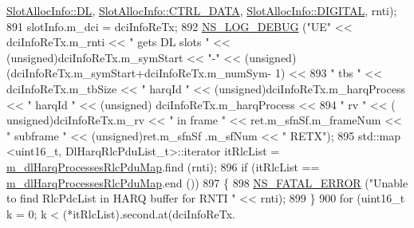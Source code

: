 \begin{DoxyCode}
      \hyperlink{structns3_1_1SlotAllocInfo_a6cad60db1d39034f1851e2cea625fe5da9a365c9c56b7c32dcae38ee1a468ce6d}{SlotAllocInfo::DL}, \hyperlink{structns3_1_1SlotAllocInfo_a3ea7cb503bfd0c9a4df55a71b81b9331a1ea636c3f068558fabacbc39934309b8}{SlotAllocInfo::CTRL\_DATA}, 
      \hyperlink{structns3_1_1SlotAllocInfo_adcbd067d82be6260b3399167d8f0b4eca47a67c342db658a08ded9ce4b49417ea}{SlotAllocInfo::DIGITAL}, rnti);
891                                         slotInfo.m\_dci = dciInfoReTx;
892                                         \hyperlink{group__logging_ga413f1886406d49f59a6a0a89b77b4d0a}{NS\_LOG\_DEBUG} (\textcolor{stringliteral}{"UE"} << dciInfoReTx.m\_rnti << \textcolor{stringliteral}{" gets DL
       slots "} << (\textcolor{keywordtype}{unsigned})dciInfoReTx.m\_symStart << \textcolor{stringliteral}{"-"} << (\textcolor{keywordtype}{unsigned})(dciInfoReTx.m\_symStart+dciInfoReTx.m\_numSym-
      1) <<
893                                                                                                 \textcolor{stringliteral}{" tbs "} << 
      dciInfoReTx.m\_tbSize << \textcolor{stringliteral}{" harqId "} << (\textcolor{keywordtype}{unsigned})dciInfoReTx.m\_harqProcess << \textcolor{stringliteral}{" harqId "} << (\textcolor{keywordtype}{unsigned})
      dciInfoReTx.m\_harqProcess <<
894                                                                                                 \textcolor{stringliteral}{" rv "} << (\textcolor{keywordtype}{
      unsigned})dciInfoReTx.m\_rv << \textcolor{stringliteral}{" in frame "} << ret.m\_sfnSf.m\_frameNum << \textcolor{stringliteral}{" subframe "} << (\textcolor{keywordtype}{unsigned})ret.m\_sfnSf
      .m\_sfNum << \textcolor{stringliteral}{" RETX"});
895                                         std::map <uint16\_t, DlHarqRlcPduList\_t>::iterator itRlcList =  
      \hyperlink{classns3_1_1MmWaveFlexTtiPfMacScheduler_a9a0027a79dee0a60f04e55c25efb7ab7}{m\_dlHarqProcessesRlcPduMap}.find (rnti);
896                                         \textcolor{keywordflow}{if} (itRlcList == 
      \hyperlink{classns3_1_1MmWaveFlexTtiPfMacScheduler_a9a0027a79dee0a60f04e55c25efb7ab7}{m\_dlHarqProcessesRlcPduMap}.end ())
897                                         \{
898                                                 \hyperlink{group__fatal_ga5131d5e3f75d7d4cbfd706ac456fdc85}{NS\_FATAL\_ERROR} (\textcolor{stringliteral}{"Unable to find RlcPdcList in
       HARQ buffer for RNTI "} << rnti);
899                                         \}
900                                         \textcolor{keywordflow}{for} (uint16\_t k = 0; k < (*itRlcList).second.at(dciInfoReTx.

\end{DoxyCode}
